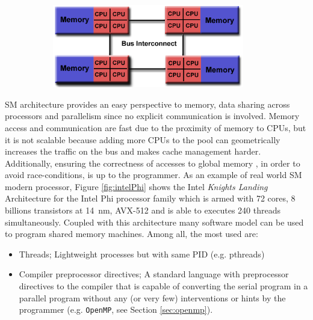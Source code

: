 \begin{description}
\begin{description}
\begin{itemize}
\begin{figure}[b]
\begin{subfigure}[b]{0.5\textwidth}
				\caption[]{}%
			\end{subfigure}%
			\begin{subfigure}[b]{0.5\textwidth}
				\centering
				\includegraphics[width=0.92\textwidth]{./images/parallel_programming/numa}
				\caption[]{}%
			\end{subfigure}%
		\label{fig:UMA_NUMA}
		\end{figure}
		

	\end{itemize}
	SM architecture provides an easy perspective to memory,	data sharing across processors and parallelism since no explicit communication is involved. Memory access and communication are fast due to the proximity of memory to CPUs, but it is not scalable because adding more CPUs to the pool can geometrically increases the traffic on the bus and makes cache management harder. Additionally, ensuring the correctness of accesses to global memory , in order to avoid race-conditions, is up to the programmer.
	As an example of real world SM modern processor, Figure \ref{fig:intelPhi} shows the Intel \textit{Knights Landing} Architecture for the Intel Phi processor family which is armed with 72 cores, $8$ billions transistors at \SI{14}{\nano\metre}, AVX-512 and is able to executes 240 threads simultaneously.
	Coupled with this architecture many software model can be used to program
	shared memory machines. Among all, the most used are:
	\begin{itemize}
		\item Threads; Lightweight processes but with same PID (e.g. pthreads)
		\item Compiler preprocessor directives; A standard language with preprocessor directives to the compiler that is capable of converting the serial program in a parallel program without any (or very few) interventions or hints by the programmer (e.g. \texttt{OpenMP}, see Section \ref{sec:openmp}).		
	\end{itemize}	


\end{description}
\end{description}
